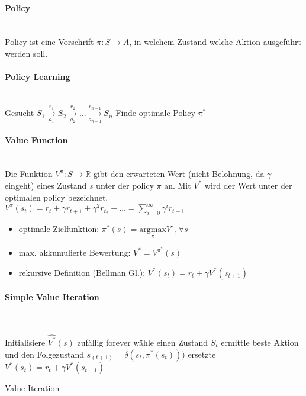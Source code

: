 \paragraph{Policy} \mbox{} \\
Policy ist eine Vorschrift $\pi: S \rightarrow A$, in welchem Zustand welche Aktion
ausgeführt werden soll.
\paragraph{Policy Learning} \mbox{} \\
Gesucht $S_{1} \xrightarrow[a_1]{r_1}S_{2}\xrightarrow[a_2]{r_2}\dots \xrightarrow[a_{n-1}]{r_{n-1}}S_n$
Finde optimale Policy $\pi^{*}$
\paragraph{Value Function} \mbox{} \\
Die Funktion $V^{\pi}:S\rightarrow \mathbb{R}$ gibt den erwarteten Wert (nicht Belohnung, da $\gamma$ eingeht)
eines Zustand $s$ unter der policy $\pi$ an. Mit $V^{*}$ wird der Wert unter der
optimalen policy bezeichnet. \\
$V^{\pi}(s_t) = r_t + {\gamma} r_{t+1} + {\gamma}^2 r_{t_2} + \dots = \sum\limits_{i=0}^{\infty} \gamma^i r_{t+1}$
\begin{itemize}
    \item optimale Zielfunktion: $\pi^{*}(s) = \underset{\pi}{\mathrm{argmax}} V^{\pi}, \forall s$
    \item max. akkumulierte Bewertung: $V^{*} = V^{\pi^{*}}(s)$
    \item rekursive Definition (Bellman Gl.): $V^{*}(s_t) = r_t + \gamma V^{*}(s_{t+1})$
\end{itemize}

\paragraph{Simple Value Iteration} \mbox{} \\
\begin{algorithm}[H]
    \begin{algorithmic}
        \State Initialisiere $\hat{V^{*}}(s)$ zufällig
        \While{} forever
            \State wähle einen Zustand $S_t$
            \State ermittle beste Aktion und den Folgezustand
            \IndState $s_(t+1) = \delta(s_t,\pi^{*}(s_t)))$
            \State ersetzte
            \IndState $V^{*}(s_t) = r_t + \gamma V^{*}(s_{t+1})$
            \EndWhile
    \caption{Value Iteration}
    \end{algorithmic}
\end{algorithm}

